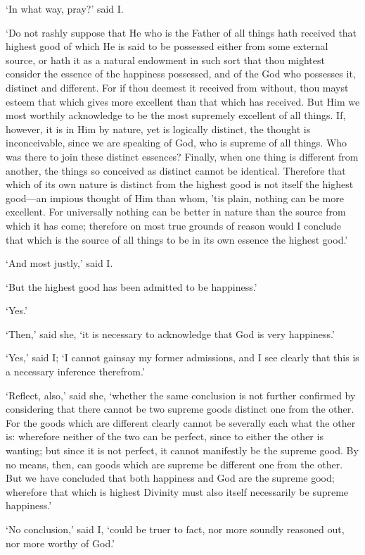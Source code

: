 \documentclass[11pt]{book}
\begin{document}
`In what way, pray?' said I.

`Do not rashly suppose that He who is the Father of all things hath
received that highest good of which He is said to be possessed either
from some external source, or hath it as a natural endowment in such
sort that thou mightest consider the essence of the happiness possessed,
and of the God who possesses it, distinct and different. For if thou
deemest it received from without, thou mayst esteem that which gives
more excellent than that which has received. But Him we most worthily
acknowledge to be the most supremely excellent of all things. If,
however, it is in Him by nature, yet is logically distinct, the thought
is inconceivable, since we are speaking of God, who is supreme of all
things. Who was there to join these distinct essences? Finally, when one
thing is different from another, the things so conceived as distinct
cannot be identical. Therefore that which of its own nature is distinct
from the highest good is not itself the highest good---an impious thought
of Him than whom, 'tis plain, nothing can be more excellent. For
universally nothing can be better in nature than the source from which
it has come; therefore on most true grounds of reason would I conclude
that which is the source of all things to be in its own essence the
highest good.'

`And most justly,' said I.

`But the highest good has been admitted to be happiness.'

`Yes.'

`Then,' said she, `it is necessary to acknowledge that God is very
happiness.'

`Yes,' said I; `I cannot gainsay my former admissions, and I see clearly
that this is a necessary inference therefrom.'

`Reflect, also,' said she, `whether the same conclusion is not further
confirmed by considering that there cannot be two supreme goods distinct
one from the other. For the goods which are different clearly cannot be
severally each what the other is: wherefore neither of the two can be
perfect, since to either the other is wanting; but since it is not
perfect, it cannot manifestly be the supreme good. By no means, then,
can goods which are supreme be different one from the other. But we have
concluded that both happiness and God are the supreme good; wherefore
that which is highest Divinity must also itself necessarily be supreme
happiness.'

`No conclusion,' said I, `could be truer to fact, nor more soundly
reasoned out, nor more worthy of God.'
\end{document}
